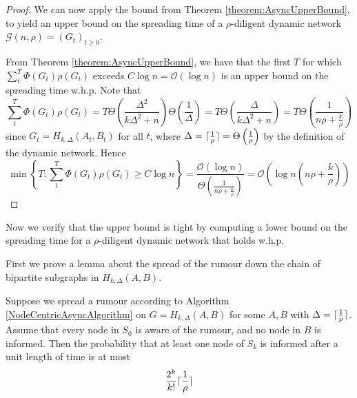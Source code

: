 \begin{proof}
	We can now apply the bound from Theorem \ref{theorem:AsyncUpperBound}, to yield an upper bound on the spreading time of a $\rho$-diligent dynamic network $\mathcal{G}(n, \rho) = (G_t)_{t\geq 0}$. 
	
	From Theorem \ref{theorem:AsyncUpperBound}, we have that the first $T$ for which $\sum_t^T \Phi(G_t)\rho(G_t)$ exceeds $C \log n = \mathcal{O}(\log n)$ is an upper bound on the spreading time w.h.p.  Note that 
	$$
		\sum_t^T \Phi(G_t)\rho(G_t)
		= 
		T \Theta\left(\frac{\Delta^2}{k\Delta^2 +n }\right) \Theta\left(\frac{1}{\Delta}\right)
		= 
		T \Theta\left(\frac{\Delta}{k\Delta^2 +n }\right)
		= 
		T \Theta\left(\frac{1}{n \rho + \frac{k}{\rho}}\right)
	$$
	since $G_t = H_{k, \Delta}(A_t,B_t)$ for all $t$, where $\Delta = \lceil\frac{1}{\rho}\rceil = \Theta\left(\frac{1}{\rho}\right)$ by the definition of the dynamic network. Hence 
	$$
		\min \left\{T : \sum_t^T \Phi(G_t)\rho(G_t) \geq C \log n \right\}
		=
		\frac{\mathcal{O}(\log n)}{\Theta\left(\frac{1}{n \rho + \frac{k}{\rho}}\right)}
		= 
		\mathcal{O}\left(\log n \left(n \rho + \frac{k}{\rho}\right)\right)
	$$
\end{proof}

Now we verify that the upper bound is tight by computing a lower bound on the spreading time for a $\rho$-diligent dynamic network that holds w.h.p.

First we prove a lemma about the spread of the rumour down the chain of bipartite subgraphs in $H_{k, \Delta}(A,B)$.

\begin{lemma}\label{lemma:H_k,DeltaABOneStep}
	Suppose we spread a rumour according to Algorithm \ref{NodeCentricAsyncAlgorithm} on $G = H_{k, \Delta}(A,B)$ for some $A, B$ with $\Delta = \lceil\frac{1}{\rho}\rceil$. Assume that every node in $S_0$ is aware of the rumour, and no node in $B$ is informed. Then the probability that at least one node of $S_k$ is informed after a unit length of time is at most
	$$
		\frac{2^k}{k!}\lceil\frac{1}{\rho}\rceil
	$$	
\end{lemma}

